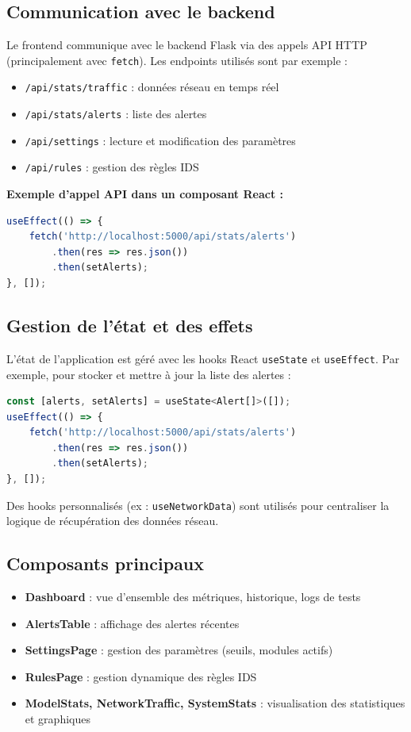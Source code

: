 \documentclass[a4paper,12pt]{article}
\begin{document}
\subsection{Communication avec le backend}
Le frontend communique avec le backend Flask via des appels API HTTP (principalement avec \texttt{fetch}). Les endpoints utilisés sont par exemple :
\begin{itemize}
  \item \texttt{/api/stats/traffic} : données réseau en temps réel
  \item \texttt{/api/stats/alerts} : liste des alertes
  \item \texttt{/api/settings} : lecture et modification des paramètres
  \item \texttt{/api/rules} : gestion des règles IDS
\end{itemize}

\textbf{Exemple d'appel API dans un composant React :}
\begin{lstlisting}[language=JavaScript]
useEffect(() => {
    fetch('http://localhost:5000/api/stats/alerts')
        .then(res => res.json())
        .then(setAlerts);
}, []);
\end{lstlisting}

\subsection{Gestion de l'état et des effets}
L'état de l'application est géré avec les hooks React \texttt{useState} et \texttt{useEffect}. Par exemple, pour stocker et mettre à jour la liste des alertes :
\begin{lstlisting}[language=JavaScript]
const [alerts, setAlerts] = useState<Alert[]>([]);
useEffect(() => {
    fetch('http://localhost:5000/api/stats/alerts')
        .then(res => res.json())
        .then(setAlerts);
}, []);
\end{lstlisting}

Des hooks personnalisés (ex : \texttt{useNetworkData}) sont utilisés pour centraliser la logique de récupération des données réseau.

\subsection{Composants principaux}
\begin{itemize}
  \item \textbf{Dashboard} : vue d'ensemble des métriques, historique, logs de tests
  \item \textbf{AlertsTable} : affichage des alertes récentes
  \item \textbf{SettingsPage} : gestion des paramètres (seuils, modules actifs)
  \item \textbf{RulesPage} : gestion dynamique des règles IDS
  \item \textbf{ModelStats, NetworkTraffic, SystemStats} : visualisation des statistiques et graphiques
\end{itemize}
\end{document}
